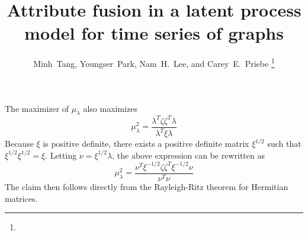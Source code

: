 \documentclass[10pt,journal,compsoc]{IEEEtran}
\theoremstyle{definition}
\begin{document}
\title{Attribute fusion in a latent process model for time series of
  graphs}
\author{Minh~Tang, Youngser~Park, Nam~H.~Lee, and Carey~E.~Priebe%
\thanks{}}
\maketitle
{}
\label{sec:proofs-some-stated}
\begin{IEEEproof}[Corollary~2]
  The maximizer of $\mu_\lambda$ also maximizes
  \begin{equation*}
    \mu_{\lambda}^{2} = \frac{\lambda^{T} \zeta \zeta^{T}
      \lambda}{\lambda^{T} \xi \lambda}
  \end{equation*}
  Because $\xi$ is positive definite, there exists a positive definite matrix
  $\xi^{1/2}$ such that $\xi^{1/2} \xi^{1/2} = \xi$. Letting $\nu = \xi^{1/2}
  \lambda$, the above expression can be rewritten as
  \begin{equation*}
    \mu_{\lambda}^{2} = \frac{\nu^{T} \xi^{-1/2} \zeta \zeta^{T}
      \xi^{-1/2} \nu}{ \nu^{T} \nu}
  \end{equation*}
  The claim then follows directly from the Rayleigh-Ritz theorem for
  Hermitian matrices.
\end{IEEEproof}
\end{document}

